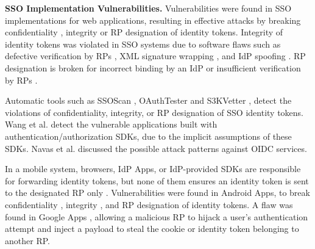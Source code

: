 \noindent\textbf{SSO Implementation Vulnerabilities.}
Vulnerabilities were found in SSO implementations for web applications,
    resulting in effective attacks %
     by breaking confidentiality \cite{WangCW12,ccsSunB12,ArmandoCCCPS13,DiscoveringJCS,dimvaLiM16}, integrity \cite{WangCW12,SomorovskyMSKJ12,WangZLG16,MainkaMS16, MainkaMSW17,dimvaLiM16} or RP designation \cite{WangZLG16,MainkaMS16,MainkaMSW17,YangLCZ18,dimvaLiM16} of identity tokens.
Integrity of identity tokens was violated in SSO systems  %
due to software flaws such as
 defective verification by RPs \cite{WangCW12,WangZLG16,MainkaMSW17}, XML signature wrapping \cite{SomorovskyMSKJ12}, and IdP spoofing \cite{MainkaMS16,MainkaMSW17}.
RP designation is broken
    for incorrect binding by an IdP \cite{YangLCZ18,WangZLG16} or insufficient verification by RPs \cite{MainkaMS16,MainkaMSW17,YangLCZ18}.

Automatic tools such as SSOScan \cite{ZhouE14}, OAuthTester \cite{YangLLZH16} and S3KVetter \cite{YangLCZ18},
detect the violations of confidentiality, integrity, or RP designation of SSO identity tokens.
Wang et al. \cite{ExplicatingSDK} detect the vulnerable applications
    built with authentication/authorization SDKs,
     due to the implicit assumptions of these SDKs.
Navas et al. \cite{NavasB19} discussed the possible attack patterns against OIDC services.

In a mobile system,
browsers, IdP Apps,
    or IdP-provided SDKs %
         are responsible for forwarding identity tokens, %
but none of them ensures an identity token is sent to the designated RP only \cite{ChenPCTKT14,WangZLLYLG15}.
Vulnerabilities were found in Android Apps,
    to break confidentiality \cite{ChenPCTKT14,WangZLLYLG15,YangLS17,ShiWL19}, integrity \cite{ChenPCTKT14,YangLS17}, and RP designation \cite{ChenPCTKT14,ShiWL19} of identity tokens.
A flaw was found in Google Apps \cite{ArmandoCCCPS13}, allowing a malicious RP to hijack a user's authentication attempt and inject a payload to steal the cookie or identity token belonging to another RP.

